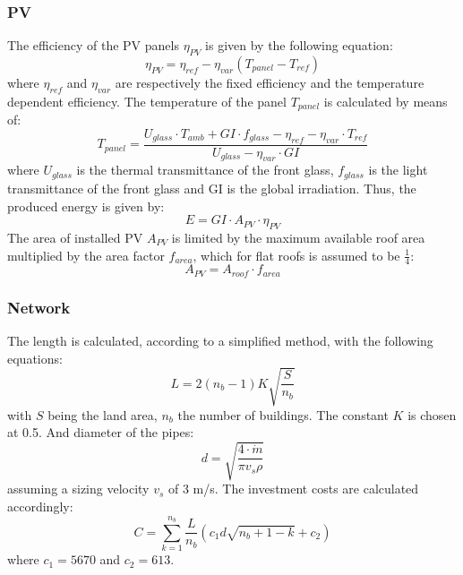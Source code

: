 \documentclass{article}
\begin{document}
\subsubsection{PV}
The efficiency of the PV panels $\eta_{PV}$ is given by the following equation:
\begin{equation}
	\eta_{PV} = \eta_{ref} - \eta_{var} (T_{panel}-T_{ref})
\end{equation}
where $\eta_{ref}$ and $\eta_{var}$ are respectively the fixed efficiency and the temperature dependent efficiency. The temperature of the panel $T_{panel}$ is calculated by means of:
\begin{equation}
	T_{panel} = \frac{U_{glass}\cdot T_{amb} + GI \cdot f_{glass}-\eta_{ref} - \eta_{var} \cdot T_{ref}}{U_{glass}-\eta_{var} \cdot GI}
\end{equation}
where $U_{glass}$ is the thermal transmittance of the front glass, $f_{glass}$ is the light transmittance of the front glass and GI is the global irradiation.
Thus, the produced energy is given by:
\begin{equation}
	E = GI \cdot A_{PV} \cdot  \eta_{PV}
\end{equation}
The area of installed PV $A_{PV}$ is limited by the maximum available roof area multiplied by the area factor $f_{area}$, which for flat roofs is assumed to be $\frac{1}{4}$:
\begin{equation}
	A_{PV} = A_{roof} \cdot f_{area}
\end{equation}


\subsubsection{Network}\label{sss:net}
The length is calculated, according to a simplified method\cite{girardinEnerGisGeographicalInformation2010}, with the following equations:
\begin{equation}
L = 2(n_{b}-1)K\sqrt{\frac{S}{n_{b}}}
\end{equation}
with $S$ being the land area, $n_{b}$ the number of buildings. The constant $K$ is chosen at 0.5.
And diameter of the pipes:
\begin{equation}
d = \sqrt{\frac{4\cdot \dot{m}}{\pi v_{s} \rho}}
\end{equation}
assuming a sizing velocity $v_{s}$ of 3 m/s.
The investment costs are calculated accordingly:
\begin{equation}
C = \sum_{k=1}^{n_{b}} \frac{L}{n_{b}} (c_{1} d \sqrt{n_{b}+1-k} + c_{2})
\end{equation}
where $c_{1} =5670 $ and $c_{2} = 613 $.\\
\end{document}
